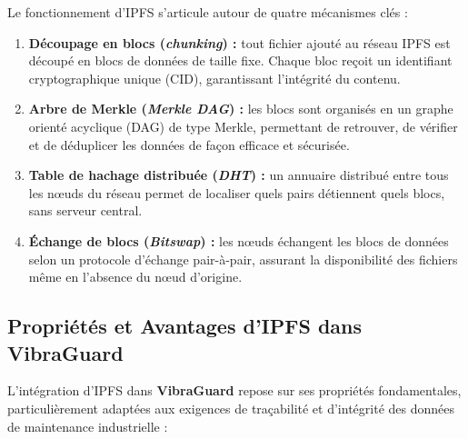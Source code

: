 \documentclass[12pt, a4paper, oneside]{report}
\newcommand{\projectname}{\textbf{VibraGuard}}
\begin{document}
Le fonctionnement d'IPFS s'articule autour de quatre mécanismes clés :

\begin{enumerate}
  \item \textbf{Découpage en blocs (\textit{chunking}) :} tout fichier ajouté au réseau IPFS
  est découpé en blocs de données de taille fixe. Chaque bloc reçoit un identifiant
  cryptographique unique (CID), garantissant l'intégrité du contenu.
  \item \textbf{Arbre de Merkle (\textit{Merkle DAG}) :} les blocs sont organisés en un graphe
  orienté acyclique (DAG) de type Merkle, permettant de retrouver, de vérifier et de
  déduplicer les données de façon efficace et sécurisée.
  \item \textbf{Table de hachage distribuée (\textit{DHT}) :} un annuaire distribué entre tous
  les nœuds du réseau permet de localiser quels pairs détiennent quels blocs, sans serveur
  central.
  \item \textbf{Échange de blocs (\textit{Bitswap}) :} les nœuds échangent les blocs de données
  selon un protocole d'échange pair-à-pair, assurant la disponibilité des fichiers même en
  l'absence du nœud d'origine.
\end{enumerate}

\subsection{Propriétés et Avantages d'IPFS dans VibraGuard}

L'intégration d'IPFS dans \projectname{} repose sur ses propriétés fondamentales, particulièrement
adaptées aux exigences de traçabilité et d'intégrité des données de maintenance industrielle :
\end{document}
